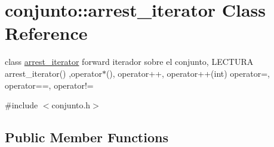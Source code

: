 \hypertarget{classconjunto_1_1arrest__iterator}{}\section{conjunto\+:\+:arrest\+\_\+iterator Class Reference}
\label{classconjunto_1_1arrest__iterator}


class \hyperlink{classconjunto_1_1arrest__iterator}{arrest\+\_\+iterator} forward iterador sobre el conjunto, L\+E\+C\+T\+U\+R\+A arrest\+\_\+iterator() ,operator$\ast$(), operator++, operator++(int) operator=, operator==, operator!=  




{\ttfamily \#include $<$conjunto.\+h$>$}

\subsection*{Public Member Functions}
